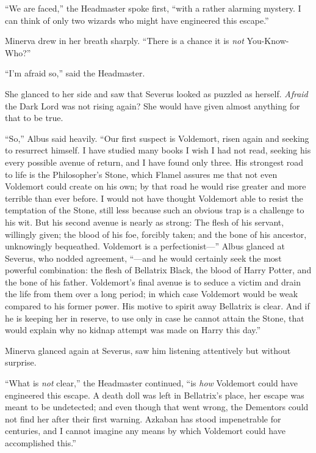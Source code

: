 ``We are faced,'' the Headmaster spoke first, ``with a rather alarming
mystery. I can think of only two wizards who might have engineered this
escape.''

Minerva drew in her breath sharply. ``There is a chance it is \emph{not}
You-Know-Who?''

``I'm afraid so,'' said the Headmaster.

She glanced to her side and saw that Severus looked as puzzled as
herself. \emph{Afraid} the Dark Lord was not rising again? She would
have given almost anything for that to be true.

``So,'' Albus said heavily. ``Our first suspect is Voldemort, risen
again and seeking to resurrect himself. I have studied many books I wish
I had not read, seeking his every possible avenue of return, and I have
found only three. His strongest road to life is the Philosopher's Stone,
which Flamel assures me that not even Voldemort could create on his own;
by that road he would rise greater and more terrible than ever before. I
would not have thought Voldemort able to resist the temptation of the
Stone, still less because such an obvious trap is a challenge to his
wit. But his second avenue is nearly as strong: The flesh of his
servant, willingly given; the blood of his foe, forcibly taken; and the
bone of his ancestor, unknowingly bequeathed. Voldemort is a
perfectionist---'' Albus glanced at Severus, who nodded agreement,
``---and he would certainly seek the most powerful combination: the
flesh of Bellatrix Black, the blood of Harry Potter, and the bone of his
father. Voldemort's final avenue is to seduce a victim and drain the
life from them over a long period; in which case Voldemort would be weak
compared to his former power. His motive to spirit away Bellatrix is
clear. And if he is keeping her in reserve, to use only in case he
cannot attain the Stone, that would explain why no kidnap attempt was
made on Harry this day.''

Minerva glanced again at Severus, saw him listening attentively but
without surprise.

``What is \emph{not} clear,'' the Headmaster continued, ``is \emph{how}
Voldemort could have engineered this escape. A death doll was left in
Bellatrix's place, her escape was meant to be undetected; and even
though that went wrong, the Dementors could not find her after their
first warning. Azkaban has stood impenetrable for centuries, and I
cannot imagine any means by which Voldemort could have accomplished
this.''

